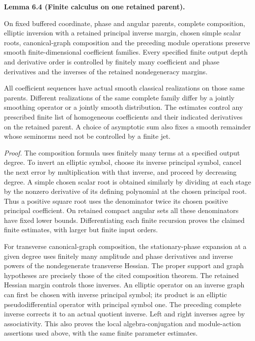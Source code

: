 \documentclass[
  english,
  11pt,
  reqno]{amsart}
\makeatletter
\newcommand{\pandocstatementheading}[1]{%
  \par\addpenalty{\@beginparpenalty}%
  \addvspace{.5\baselineskip plus .2\baselineskip minus .2\baselineskip}%
  {\normalfont\bfseries #1\par}%
  \nobreak\@afterindenttrue\@afterheading
}
\makeatother
\begin{document}
\pandocstatementheading{\leavevmode{}\label{lem:online-finite-symbol-family-calculus}Lemma 6.4 (Finite calculus on one retained parent).}

On fixed buffered coordinate, phase and angular parents, complete
composition, elliptic inversion with a retained principal inverse
margin, chosen simple scalar roots, canonical-graph composition and the
preceding module operations preserve smooth finite-dimensional
coefficient families. Every specified finite output depth and derivative
order is controlled by finitely many coefficient and phase derivatives
and the inverses of the retained nondegeneracy margins.

All coefficient sequences have actual smooth classical realizations on
those same parents. Different realizations of the same complete family
differ by a jointly smoothing operator or a jointly smooth distribution.
The estimates control any prescribed finite list of homogeneous
coefficients and their indicated derivatives on the retained parent. A
choice of asymptotic sum also fixes a smooth remainder whose seminorms
need not be controlled by a finite jet.

\emph{Proof.} The composition formula uses finitely many terms at a
specified output degree. To invert an elliptic symbol, choose its
inverse principal symbol, cancel the next error by multiplication with
that inverse, and proceed by decreasing degree. A simple chosen scalar
root is obtained similarly by dividing at each stage by the nonzero
derivative of its defining polynomial at the chosen principal root. Thus
a positive square root uses the denominator twice its chosen positive
principal coefficient. On retained compact angular sets all these
denominators have fixed lower bounds. Differentiating each finite
recursion proves the claimed finite estimates, with larger but finite
input orders.

For transverse canonical-graph composition, the stationary-phase
expansion at a given degree uses finitely many amplitude and phase
derivatives and inverse powers of the nondegenerate transverse Hessian.
The proper support and graph hypotheses are precisely those of the cited
composition theorem. The retained Hessian margin controls those
inverses. An elliptic operator on an inverse graph can first be chosen
with inverse principal symbol; its product is an elliptic
pseudodifferential operator with principal symbol one. The preceding
complete inverse corrects it to an actual quotient inverse. Left and
right inverses agree by associativity. This also proves the local
algebra-conjugation and module-action assertions used above, with the
same finite parameter estimates.
\end{document}
